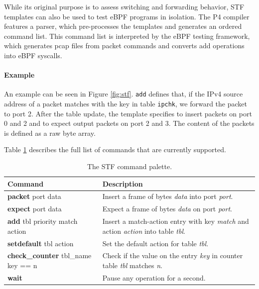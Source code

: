 While its original purpose is to assess switching and forwarding behavior, STF 
templates can also be used to test eBPF programs in isolation. The P4 compiler 
features a parser, which pre-processes the templates and generates an ordered 
command list. This command list is interpreted by the eBPF testing framework, 
which generates pcap files from packet commands and converts add operations 
into eBPF syscalls.

\paragraph{Example}
An example can be seen in Figure \ref{fig:stf}. \texttt{add} defines that, if 
the IPv4 source address of a packet matches with the key in table 
\texttt{ipchk}, we forward the packet to 
port 2. After the table update, the template specifies to insert packets on 
port 0 and 2 and to expect output packets on port 2 and 3. The content of the 
packets is defined as a raw byte array.

Table \ref{table:stf} describes the full list of commands that are currently 
supported.


\begin{table}[h]
	\begin{center}
		\begin{tabular}{|l|p{9cm}|} \hline
			\textbf{Command} & \textbf{Description} \\ \hline \hline
			\textbf{packet} port data & Insert a frame of bytes
			\textit{data} into port \textit{port}.    \\ \hline
			\textbf{expect} port data & Expect a frame of bytes
			\textit{data} on port \textit{port}.  \\ \hline
			\textbf{add} tbl priority match action & Insert a
			match-action entry with key \textit{match} and action
			\textit{action} into table \textit{tbl}. \\ \hline
			\textbf{setdefault} tbl action & Set the default action for table
			\textit{tbl}. \\
			\hline
			\textbf{check\_counter} tbl\_name key == n & Check if the value on
			the entry \textit{key} in counter table \textit{tbl} matches
			\textit{n}.  \\
			\hline
			\textbf{wait} & Pause any operation for a second. \\ \hline
		\end{tabular}
		\caption{The STF command palette.}\label{table:stf}
	\end{center}
\end{table}

